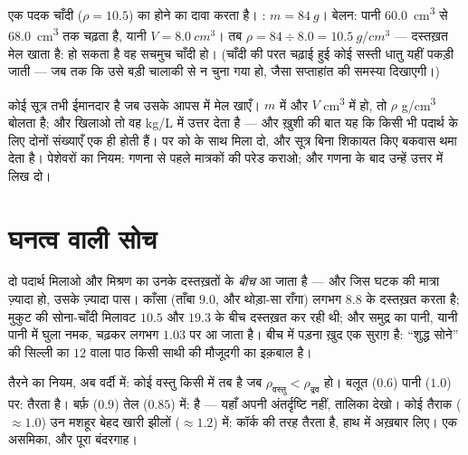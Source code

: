 \begin{example}[किसी ठोस का घनत्व, शुरू से अंत तक]\label{ex:g7:volume-mass-density:solid}
एक पदक चाँदी ($\rho = 10.5$) का होने का दावा करता है। :
$m = \qty{84}{g}$। बेलन: पानी \qty{60.0}{cm^3} से \qty{68.0}{cm^3}
तक चढ़ता है, यानी $V = \qty{8.0}{cm^3}$। तब
$\rho = 84 \div 8.0 = \qty{10.5}{g/cm^3}$ --- दस्तख़त मेल खाता है:
हो सकता है वह सचमुच चाँदी हो। (चाँदी की परत चढ़ाई हुई कोई सस्ती धातु
यहीं पकड़ी जाती --- जब तक कि उसे बड़ी चालाकी से न चुना गया हो, जैसा
सप्ताहांत की समस्या दिखाएगी।)
\end{example}

\begin{remark}[सूत्रों में मात्रक]\label{rem:g7:volume-mass-density:units}
कोई सूत्र तभी ईमानदार है जब उसके  आपस में मेल खाएँ। $m$ 
में और $V$ \unit{cm^3} में हो, तो $\rho$ \unit{g/cm^3} बोलता है;
 और  खिलाओ तो वह \unit{kg/L} में उत्तर देता है --- और
ख़ुशी की बात यह कि किसी भी पदार्थ के लिए दोनों संख्याएँ एक ही होती हैं।
पर  को  के साथ मिला दो, और सूत्र बिना शिकायत किए बकवास थमा
देता है। पेशेवरों का नियम: गणना से पहले मात्रकों की परेड कराओ; और गणना
के बाद उन्हें उत्तर में लिख दो।
\end{remark}

\section{घनत्व वाली सोच}

\begin{example}[मिश्रधातुएँ और बीच के मान]\label{ex:g7:volume-mass-density:alloys}
दो पदार्थ मिलाओ और मिश्रण का  उनके दस्तख़तों के \emph{बीच} आ
जाता है --- और जिस घटक की मात्रा ज़्यादा हो, उसके ज़्यादा पास। काँसा
(ताँबा $9.0$, और थोड़ा-सा राँगा) लगभग $8.8$ के दस्तख़त करता है; मुकुट
की सोना-चाँदी मिलावट $10.5$ और $19.3$ के बीच दस्तख़त कर रही थी; और
समुद्र का पानी, यानी पानी में घुला नमक, चढ़कर लगभग $1.03$ पर आ जाता
है। बीच में पड़ना ख़ुद एक सुराग़ है: ``शुद्ध सोने'' की सिल्ली का $12$
वाला पाठ किसी साथी की मौजूदगी का इक़बाल है।
\end{example}

\begin{example}\label{ex:g7:volume-mass-density:floating}
तैरने का नियम, अब वर्दी में: कोई वस्तु किसी  में तब  है जब
$\rho_{\text{वस्तु}} < \rho_{\text{द्रव}}$ हो। बलूत ($0.6$) पानी
($1.0$) पर: तैरता है। बर्फ़ ($0.9$) तेल ($0.85$) में:  है ---
यहाँ अपनी अंतर्दृष्टि नहीं, तालिका देखो। कोई तैराक ($\approx 1.0$)
उन मशहूर बेहद खारी झीलों ($\approx 1.2$) में: कॉर्क की तरह तैरता है,
हाथ में अख़बार लिए। एक असमिका, और पूरा बंदरगाह।
\end{example}

